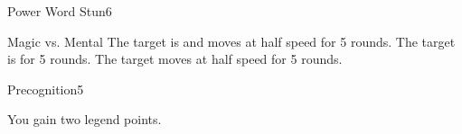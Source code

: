 \begin{spellsection}{Power Word Stun}{6}
    \begin{spellheader}
    \end{spellheader}
    \begin{spellcontent}
        \begin{spelltargetinginfo}
        \end{spelltargetinginfo}
        \begin{spelleffects}
            \begin{spellattack}{Magic vs. Mental}
                \spellsuccess The target is \dazed and moves at half speed for 5 rounds.
                \spellcritical The target is \stunned for 5 rounds.
                \spellfailure The target moves at half speed for 5 rounds.
            \end{spellattack}
        \end{spelleffects}
    \end{spellcontent}
    \begin{spellfooter}
        \miscastrandom
    \end{spellfooter}
\end{spellsection}

\begin{spellsection}{Precognition}{5}
    \begin{spellheader}
    \end{spellheader}
    \begin{spellcontent}
        \begin{spelltargetinginfo}
        \end{spelltargetinginfo}
        \begin{spelleffects}
            \spelleffect You gain two legend points.
            \spelldur \durshort \dismissable
        \end{spelleffects}
    \end{spellcontent}
    \begin{spellfooter}
        \miscastexplode
    \end{spellfooter}
\end{spellsection}

